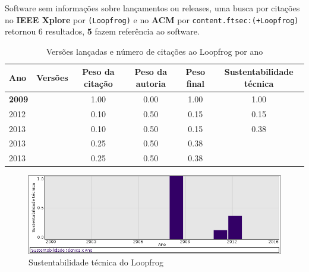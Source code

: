 Software sem informações sobre lançamentos ou releases,
uma busca por citações no {\bf IEEE Xplore} por
\texttt{(Loopfrog)}
e no {\bf ACM} por
\texttt{content.ftsec:(+Loopfrog)}
retornou
6 resultados,
{\bf 5} fazem referência ao software.


\begin{table}[H]
\caption{Versões lançadas e número de citações ao Loopfrog por ano}
\centering
\begin{tabular}{| l | c | c | c | c | c |}
  \hline
  Ano & Versões & Peso da citação & Peso da autoria & Peso final & Sustentabilidade técnica \\
  \hline
            {\bf 2009}
          &
          
          &
          1.00
          &
          0.00
          &
          1.00
          &
            {\color{blue} 1.00}
          \\
\hline
            2012
          &
          
          &
          0.10
          &
          0.50
          &
          0.15
          &
            {\color{red} 0.15}
          \\
\hline
            2013
          &
          
          &
          0.10
          &
          0.50
          &
          0.15
          &
            {\color{red} 0.38}
          \\
            2013
          &
          
          &
          0.25
          &
          0.50
          &
          0.38
          &
          \\
            2013
          &
          
          &
          0.25
          &
          0.50
          &
          0.38
          &
          \\
\hline
\end{tabular}
\end{table}

\begin{figure}[h]
  \center
  \includegraphics[scale=0.50]{imagens/softwares-charts/loopfrog.png}
  \caption{Sustentabilidade técnica do Loopfrog}
\end{figure}


